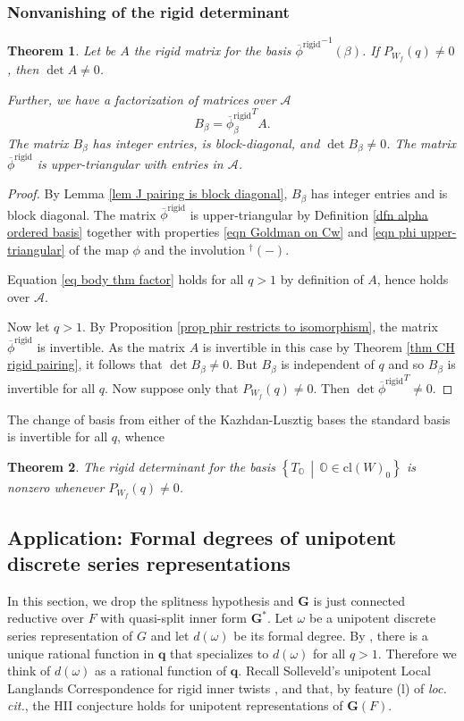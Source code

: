 \documentclass[10pt]{article}
\newcommand{\sets}[2]{\left\{#1\,\middle|\,#2\right\}}
\newcommand{\G}{\mathbf{G}}
\newcommand{\bq}{\mathbf{q}}
\newtheorem{theorem}{Theorem}
\theoremstyle{definition}
\theoremstyle{remark}
\newcommand{\phir}{\overline{\phi}^{\mathrm{rigid}}}
\newcommand{\cl}{\mathrm{cl}}
\newcommand{\oO}{\mathbb{O}}
\begin{document}
\subsubsection{Nonvanishing of the rigid determinant}
%
%
\begin{theorem}
\label{thm rigid pairing factors}
%
Let be $A$ the rigid matrix for the basis ${\phir}^{-1}(\beta)$. If $P_{W_f}(q)\neq 0$, then 
$\det A\neq 0$. 

Further, we have a factorization of matrices over $\mathcal{A}$
%
\begin{equation}
\label{eq body thm factor}
B_\beta={\phir_\beta}^{T}A.
\end{equation}
%
The matrix $B_\beta$ has integer entries, is block-diagonal, and $\det B_\beta\neq 0$. The matrix $\phir$ is upper-triangular
with entries in $\mathcal{A}$.
%
\end{theorem}
%
\begin{proof}
By Lemma \ref{lem J pairing is block diagonal}, $B_\beta$ has integer entries and is block 
diagonal. The matrix $\phir$ is upper-triangular by Definition \ref{dfn alpha ordered basis} together 
with properties  \eqref{eqn Goldman on Cw} and \eqref{eqn phi upper-triangular} of the map $\phi$
and the involution ${}^\dagger(-)$.

Equation \eqref{eq body thm factor} holds for all $q>1$ by definition of $A$, hence  holds over 
$\mathcal{A}$.

Now let $q>1$. By Proposition \ref{prop phir restricts to isomorphism}, the matrix $\phir$ is invertible.
As the matrix $A$ is invertible in this case by Theorem \ref{thm CH rigid pairing}, it follows 
that $\det B_\beta\neq 0$. But $B_\beta$ is independent of $q$ and so $B_\beta$ is invertible for all $q$.
Now suppose only that $P_{W_f}(q)\neq 0$. Then $\det{\phir}^T\neq 0$.
%
\end{proof}
%
The change of basis from either of the Kazhdan-Lusztig bases the standard basis is invertible 
for all $q$, whence
%
\begin{theorem}
\label{cor main thm body}
The rigid determinant for the basis $\sets{T_\oO}{\oO\in\cl(W)_0}$ is nonzero whenever 
$P_{W_f}(q)\neq 0$.
\end{theorem}
%
\subsection{Application: Formal degrees of unipotent discrete series representations}
\label{subsection application formal degrees}
In this section, we drop the splitness hypothesis and $\G$ is just connected reductive over $F$ with quasi-split inner form $\G^*$. Let $\omega$ be a 
unipotent discrete series representation of $G$ and let $d(\omega)$ be its formal degree. 
By \cite{Solleveldfdegsequel}, there is a unique rational function in $\bq$ that
specializes to $d(\omega)$ for all $q>1$. Therefore we think of $d(\omega)$ as a rational function of $\bq$. 
Recall Solleveld's unipotent Local Langlands Correspondence for rigid inner twists 
\cite[Thms. 1, 3]{Solleveldfdegsequel}, and that, by feature (l) of \textit{loc. cit.}, the HII conjecture 
holds for unipotent representations of $\G(F)$.
\end{document}

